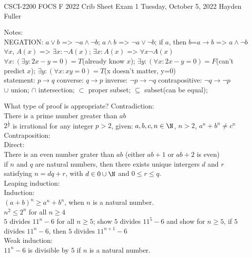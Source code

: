\documentclass[11pt]{article}
\def\NOT{\neg}
\def\OR{\vee}
\def\AND{\wedge}
\def\imp{\rightarrow}
\begin{document}
CSCI-2200 FOCS F 2022 Crib Sheet Exam 1 Tuesday, October 5, 2022 Hayden Fuller
\begin{large}
\noindent Notes:
\\NEGATION: $a\OR b$ => $\NOT a\AND\NOT b$; $a\AND b$ => $\NOT a\OR\NOT b$; if $a$, then $b$=$a\imp b$ => $a\AND\NOT b$
\\$\forall x$, $A(x)$ => $\exists x : \NOT A(x)$; $\exists x:A(x)$ => $\forall x \NOT A(x)$
\\$\forall x:(\exists y:2x-y=0)=T$(already know $x$); $\exists y:(\forall x:2x-y=0)=F$(can't predict $x$); $\exists y:(\forall x:xy=0)=T$(x doesn't matter, y=0)
\\statement: $p\imp q$ converse: $q\imp p$ inverse: $\NOT p\imp\NOT q$ contrapositive: $\NOT q\imp\NOT p$
\\$\cup$ union; $\cap$ intersection; $\subset$ proper subset; $\subseteq$ subset(can be equal);

What type of proof is appropriate? Contradiction:
\\There is a prime number greater than $ab$
\\$2^{\frac{1}{p}}$ is irrational for any integer $p>2$, given: $a,b,c,n\in\N$, $n>2$, $a^n+b^n\ne c^n$
\\Contraposition:
\\Direct:
\\There is an even number grater than $ab$ (either $ab+1$ or $ab+2$ is even)
\\if $n$ and $q$ are natural numbers, then there exists unique intergers $d$ and $r$ satisfying $n=dq+r$, with $d\in{0}\cup\N$ and $0\le r\le q$.
\\Leaping induction:
\\Induction:
\\$(a+b)^n\ge a^n+b^n$, when $n$ is a natural number.
\\$n^2\le2^n$ for all $n\ge4$
\\$5$ divides $11^n-6$ for all $n\ge5$; show $5$ divides $11^5-6$ and show for $n\ge5$, if $5$ divides $11^n-6$, then $5$ divides $11^{n+1}-6$
\\Weak induction:
\\$11^n-6$ is divisible by $5$ if $n$ is a natural number.

\end{large}
\end{document}
